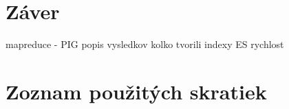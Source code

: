 \documentclass[11pt,twoside,a4paper]{book}
\begin{document}
\chapter{Záver}
mapreduce - PIG
popis vysledkov
kolko tvorili indexy
ES rychlost 




















%
{
\def\CS{$\cal C\kern-0.1667em\lower.5ex\hbox{$\cal S$}\kern-0.075em $}

}

%

\appendix


\chapter{Zoznam použitých skratiek}
\end{document}
